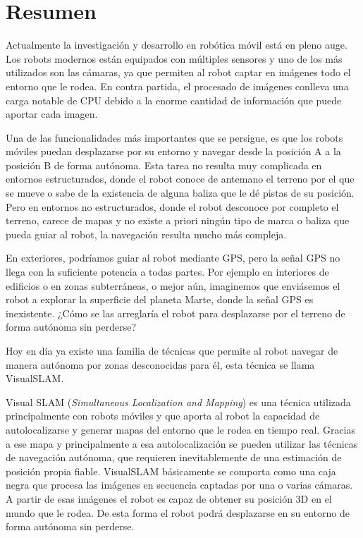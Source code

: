 \chapter*{Resumen}

Actualmente la investigación y desarrollo en robótica móvil está en pleno auge. Los robots modernos están equipados con múltiples sensores y uno de los más utilizados son las cámaras, ya que permiten al robot captar en imágenes todo el entorno que le rodea. En contra partida, el procesado de imágenes conlleva una carga notable de CPU debido a la enorme cantidad de información que puede aportar cada imagen.

Una de las funcionalidades más importantes que se persigue, es que los robots móviles puedan desplazarse por su entorno y navegar desde la posición A a la posición B de forma autónoma. 
Esta tarea no resulta muy complicada en entornos estructurados, donde el robot conoce de antemano el terreno por el que se mueve o sabe de la existencia de alguna baliza que le dé pistas de su posición.
Pero en entornos no estructurados, donde el robot desconoce por completo el terreno, carece de mapas y no existe a priori ningún tipo de marca o baliza que pueda guiar al robot, la navegación resulta mucho más compleja.

En exteriores, podríamos guiar al robot mediante GPS, pero la señal GPS no llega con la suficiente potencia a todas partes. Por ejemplo en interiores de edificios o en zonas subterráneas, o mejor aún, imaginemos que enviásemos el robot a explorar la superficie del planeta Marte, donde la señal GPS es inexistente. ¿Cómo se las arreglaría el robot para desplazarse por el terreno de forma autónoma sin perderse?

Hoy en día ya existe una familia de técnicas que permite al robot navegar de manera autónoma por zonas desconocidas para él, esta técnica se llama VisualSLAM.


Visual SLAM (\textit{Simultaneous Localization and Mapping}) es una técnica utilizada principalmente con robots móviles y que aporta al robot la capacidad de autolocalizarse y generar mapas del entorno que le rodea en tiempo real. Gracias a ese mapa y principalmente a esa autolocalización se pueden utilizar las técnicas de navegación autónoma, que requieren inevitablemente de una estimación de posición propia fiable. VisualSLAM básicamente se comporta como una caja negra que procesa las imágenes en secuencia captadas por una o varias cámaras. A partir de esas imágenes el robot es capaz de obtener su posición 3D en el mundo que le rodea. De esta forma el robot podrá desplazarse en su entorno de forma autónoma sin perderse.

